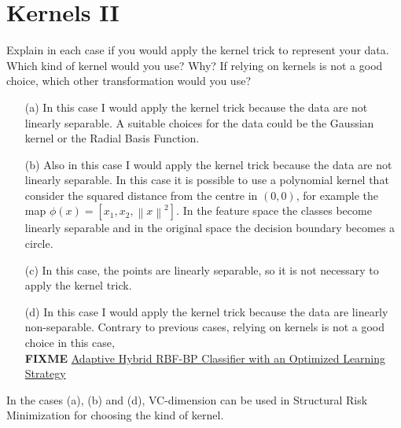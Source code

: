 \section{Kernels II}

Explain in each case if you would apply the kernel trick to represent your 
data. Which kind of kernel would you use? Why? If relying on kernels is not 
a good choice, which other transformation would you use?
\begin{itemize}
	\item[(a)] In this case I would apply the kernel trick because the data are 
	not	linearly separable. %
	A suitable choices for the data could be the Gaussian kernel or the Radial 
	Basis Function.
	
	\item[(b)] Also in this case I would apply the kernel trick because the 
	data are not linearly separable. 
	In this case it is possible to use a polynomial kernel that consider the 
	squared distance from the centre in $(0, 0)$, for example the map 
	$\phi(x)=[x_1, x_2, {\left\| x\right\|}^{2}]$. In the feature space the 
	classes become linearly separable and in the original space the decision 
	boundary becomes a circle.
	
	\item[(c)] In this case, the points are linearly separable, so it is not 
	necessary to apply the kernel trick.  
	
	\item[(d)] In this case I would apply the kernel trick because the data 
	are linearly non-separable. Contrary to previous cases, relying on kernels 
	is not a good choice in this case, \\ \textbf{FIXME}
	\href{https://www.researchgate.net/publication/309545761\_A\_Structure- 
	Adaptive\_Hybrid\_RBF-BP\_Classifier\_with\_an\_Optimized\_Learning\_Strategy}{Adaptive
	 Hybrid RBF-BP Classifier with an Optimized Learning Strategy}
\end{itemize}
In the cases (a), (b) and (d), VC-dimension can be used in Structural Risk 
Minimization for choosing the kind of kernel.
